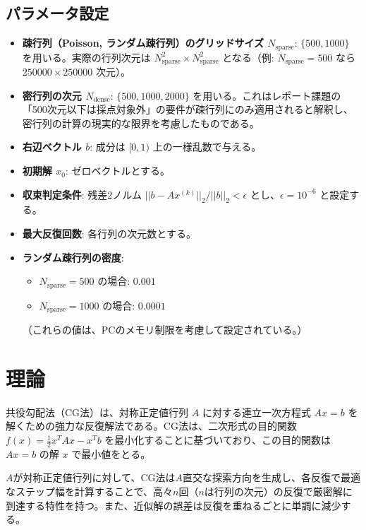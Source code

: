\documentclass{article}
\begin{document}
\subsection{パラメータ設定}
\begin{itemize}
    \item \textbf{疎行列（Poisson, ランダム疎行列）のグリッドサイズ $N_{\text{sparse}}$}: $\{500, 1000\}$ を用いる。実際の行列次元は $N_{\text{sparse}}^2 \times N_{\text{sparse}}^2$ となる（例: $N_{\text{sparse}}=500$ なら $250000 \times 250000$ 次元）。
    \item \textbf{密行列の次元 $N_{\text{dense}}$}: $\{500, 1000, 2000\}$ を用いる。これはレポート課題の「500次元以下は採点対象外」の要件が疎行列にのみ適用されると解釈し、密行列の計算の現実的な限界を考慮したものである。
    \item \textbf{右辺ベクトル $b$}: 成分は $[0,1)$ 上の一様乱数で与える。
    \item \textbf{初期解 $x_0$}: ゼロベクトルとする。
    \item \textbf{収束判定条件}: 残差2ノルム $||b-Ax^{(k)}||_2 / ||b||_2 < \epsilon$ とし、$\epsilon = 10^{-6}$ と設定する。
    \item \textbf{最大反復回数}: 各行列の次元数とする。
    \item \textbf{ランダム疎行列の密度}:
        \begin{itemize}
            \item $N_{\text{sparse}}=500$ の場合: $0.001$
            \item $N_{\text{sparse}}=1000$ の場合: $0.0001$
        \end{itemize}
        （これらの値は、PCのメモリ制限を考慮して設定されている。）
\end{itemize}

\section{理論}
共役勾配法（CG法）は、対称正定値行列 $A$ に対する連立一次方程式 $Ax=b$ を解くための強力な反復解法である。CG法は、二次形式の目的関数 $f(x) = \frac{1}{2}x^T Ax - x^T b$ を最小化することに基づいており、この目的関数は $Ax=b$ の解 $x$ で最小値をとる。

$A$が対称正定値行列に対して、CG法は$A$直交な探索方向を生成し、各反復で最適なステップ幅を計算することで、高々$n$回（$n$は行列の次元）の反復で厳密解に到達する特性を持つ。また、近似解の誤差は反復を重ねるごとに単調に減少する。
\end{document}
